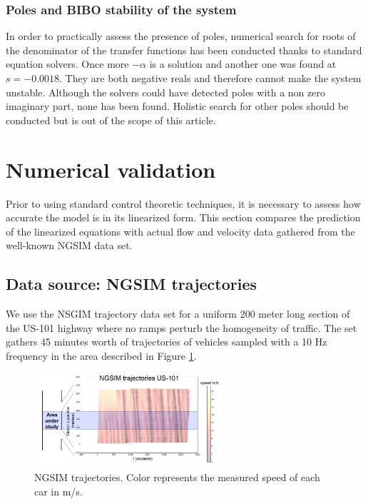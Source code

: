\documentclass[a4paper, 10pt, conference]{ieeeconf}      %
\begin{document}
\subsubsection{Poles and BIBO stability of the system}
In order to practically assess the presence of poles, numerical search for roots of the denominator of the transfer functions has been conducted thanks to standard equation solvers. Once more $-\alpha$ is a solution and another one was found at $s=-0.0018$. They are both negative reals and therefore cannot make the system unstable. Although the solvers could have detected poles with a non zero imaginary part, none has been found. Holistic search for other poles should be conducted but is out of the scope of this article.


\section{Numerical validation}
Prior to using standard control theoretic techniques, it is necessary to assess how accurate the model is in its linearized form. This section compares the prediction of the linearized equations with actual flow and velocity data gathered from the well-known NGSIM data set.


\subsection{Data source: NGSIM trajectories}
We use the NSGIM trajectory data set for a uniform 200 meter long section of the US-101 highway where no ramps perturb the homogeneity of traffic. The set gathers 45 minutes worth of trajectories of vehicles sampled with a 10 Hz frequency in the area described in Figure \ref{fig:NGSIM-trajectories}.

\begin{figure}
\centering
\includegraphics[width=7cm]{US-101_all_traj_low_res_mod}
\protect\caption{NGSIM trajectories. Color represents the measured speed of each
car in m/s.}
\label{fig:NGSIM-trajectories}
\end{figure}
\end{document}
